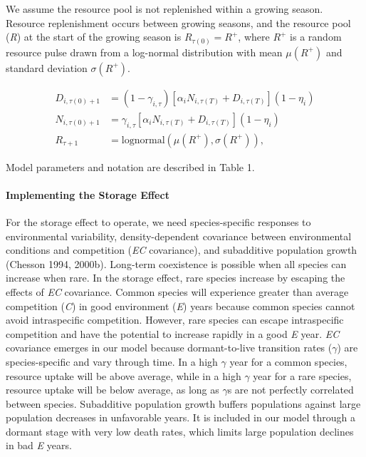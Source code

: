 \documentclass[12pt,]{article}
\let\oldparagraph\paragraph
\renewcommand{\paragraph}[1]{\oldparagraph{#1}\mbox{}}
\begin{document}
We assume the resource pool is not replenished within a growing season.
Resource replenishment occurs between growing seasons, and the resource
pool (\emph{R}) at the start of the growing season is
\(R_{\tau(0)} = R^+\), where \(R^+\) is a random resource pulse drawn
from a log-normal distribution with mean \(\mu(R^+)\) and standard
deviation \(\sigma(R^+)\).
\vspace{-3em}

\begin{align}
  D_{i,\tau(0) + 1} &= (1-\gamma_{i,\tau}) \left[\alpha_i N_{i,\tau(T)} + D_{i,\tau(T)} \right] (1-\eta_i) \\
  N_{i,\tau(0) + 1} &= \gamma_{i,\tau} \left[\alpha_i N_{i,\tau(T)} + D_{i,\tau(T)} \right] (1-\eta_i) \\
  R_{\tau + 1} &= \text{lognormal}\left(\mu(R^+), \sigma(R^+) \right),
\end{align}\vspace{-3em}

\noindent {}
Model parameters and notation are described in Table 1.

\paragraph{Implementing the Storage
Effect}\label{implementing-the-storage-effect}

For the storage effect to operate, we need species-specific responses to
environmental variability, density-dependent covariance between
environmental conditions and competition (\emph{EC} covariance), and
subadditive population growth (Chesson 1994, 2000b). Long-term
coexistence is possible when all species can increase when rare. In the
storage effect, rare species increase by escaping the effects of
\emph{EC} covariance. Common species will experience greater than
average competition (\emph{C}) in good environment (\emph{E}) years
because common species cannot avoid intraspecific competition. However,
rare species can escape intraspecific competition and have the potential
to increase rapidly in a good \emph{E} year. \emph{EC} covariance
emerges in our model because dormant-to-live transition rates
(\(\gamma\)) are species-specific and vary through time. In a high
\(\gamma\) year for a common species, resource uptake will be above
average, while in a high \(\gamma\) year for a rare species, resource
uptake will be below average, as long as \(\gamma\)s are not perfectly
correlated between species. Subadditive population growth buffers
populations against large population decreases in unfavorable years. It
is included in our model through a dormant stage with very low death
rates, which limits large population declines in bad \emph{E} years.
\end{document}
